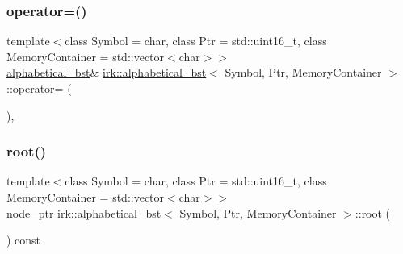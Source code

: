 \mbox{\label{classirk_1_1alphabetical__bst_ac10152f7ca8cc4a04ffdae7ff6248b94}} 
\subsubsection{\texorpdfstring{operator=()}{operator=()}\hspace{0.1cm}{\footnotesize\ttfamily [2/2]}}
{\footnotesize\ttfamily template$<$class Symbol = char, class Ptr = std\+::uint16\+\_\+t, class Memory\+Container = std\+::vector$<$char$>$$>$ \\
\mbox{\hyperlink{classirk_1_1alphabetical__bst}{alphabetical\+\_\+bst}}\& \mbox{\hyperlink{classirk_1_1alphabetical__bst}{irk\+::alphabetical\+\_\+bst}}$<$ Symbol, Ptr, Memory\+Container $>$\+::operator= (\begin{DoxyParamCaption}\item[{\mbox{\hyperlink{classirk_1_1alphabetical__bst}{alphabetical\+\_\+bst}}$<$ Symbol, Ptr, Memory\+Container $>$ \&\&}]{ }\end{DoxyParamCaption})\hspace{0.3cm}{\ttfamily [default]}, {\ttfamily [noexcept]}}

\mbox{\label{classirk_1_1alphabetical__bst_a28fa90a8d7eec6045a035c44e93a1a13}} 
\subsubsection{\texorpdfstring{root()}{root()}}
{\footnotesize\ttfamily template$<$class Symbol = char, class Ptr = std\+::uint16\+\_\+t, class Memory\+Container = std\+::vector$<$char$>$$>$ \\
\mbox{\hyperlink{structirk_1_1alphabetical__bst_1_1node__ptr}{node\+\_\+ptr}} \mbox{\hyperlink{classirk_1_1alphabetical__bst}{irk\+::alphabetical\+\_\+bst}}$<$ Symbol, Ptr, Memory\+Container $>$\+::root (\begin{DoxyParamCaption}{ }\end{DoxyParamCaption}) const\hspace{0.3cm}{\ttfamily [inline]}}



